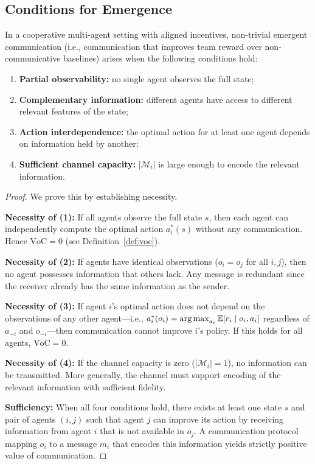\documentclass[11pt,a4paper]{article}
\begin{document}
\subsection{Conditions for Emergence}

\begin{theorem}
\label{thm:emergence-conditions}
In a cooperative multi-agent setting with aligned incentives,
non-trivial emergent communication (i.e., communication that
improves team reward over non-communicative baselines) arises
when the following conditions hold:
\begin{enumerate}[nosep]
  \item \textbf{Partial observability:} no single agent observes
    the full state;
  \item \textbf{Complementary information:} different agents have
    access to different relevant features of the state;
  \item \textbf{Action interdependence:} the optimal action for
    at least one agent depends on information held by another;
  \item \textbf{Sufficient channel capacity:}
    $|\mathcal{M}_i|$ is large enough to encode the relevant
    information.
\end{enumerate}
\end{theorem}

\begin{proof}
We prove this by establishing necessity.

\textbf{Necessity of (1):} If all agents observe the full state
$s$, then each agent can independently compute the optimal action
$a_i^*(s)$ without any communication.  Hence $\text{VoC} = 0$
(see Definition~\ref{def:voc}).

\textbf{Necessity of (2):} If agents have identical observations
($o_i = o_j$ for all $i, j$), then no agent possesses
information that others lack.  Any message is redundant since the
receiver already has the same information as the sender.

\textbf{Necessity of (3):} If agent $i$'s optimal action does not
depend on the observations of any other agent---i.e., $a_i^*(o_i)
= \operatorname{arg\,max}_{a_i} \mathbb{E}[r_i \mid o_i, a_i]$ regardless of $a_{-i}$
and $o_{-i}$---then communication cannot improve $i$'s policy.
If this holds for all agents, $\text{VoC} = 0$.

\textbf{Necessity of (4):} If the channel capacity is zero
($|\mathcal{M}_i| = 1$), no information can be transmitted.
More generally, the channel must support encoding of the relevant
information with sufficient fidelity.

\textbf{Sufficiency:} When all four conditions hold, there
exists at least one state $s$ and pair of agents $(i,j)$ such
that agent $j$ can improve its action by receiving information
from agent $i$ that is not available in $o_j$.  A communication
protocol mapping $o_i$ to a message $m_i$ that encodes this
information yields strictly positive value of communication.
\end{proof}
\end{document}
